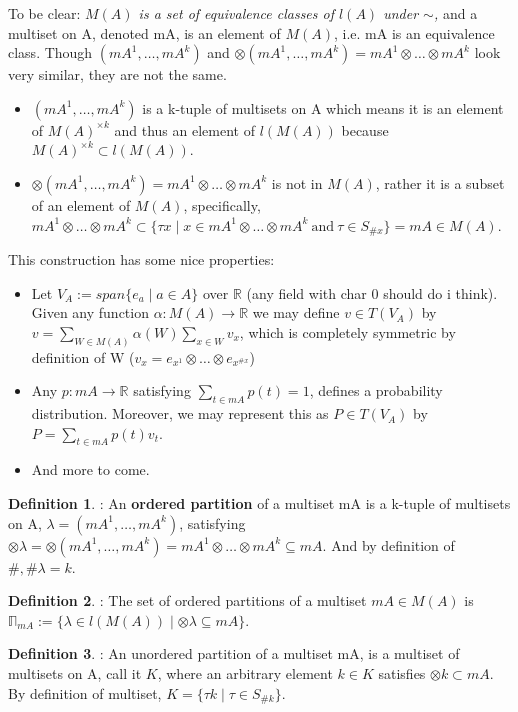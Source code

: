 \documentclass{article}
\theoremstyle{definition}
\newtheorem{definition}{Definition}
\begin{document}
To be clear: \textit{$M(A)$ is a set of equivalence classes of $l(A)$ under $\sim$,} and a multiset on A, denoted mA, is an element of $M(A)$, i.e. mA is an equivalence class. Though $(mA^1,\dots,mA^k)$ and $\otimes(mA^1,\dots,mA^k)=mA^1\otimes\dots\otimes mA^k$ look very similar, they are not the same.
\begin{itemize}
\item $(mA^1,\dots,mA^k)$ is a k-tuple of multisets on A which means it is an element of $M(A)^{\times k}$ and thus an element of $l(M(A))$ because $M(A)^{\times k} \subset l(M(A))$.
\item $\otimes(mA^1,\dots,mA^k)=mA^1 \otimes\dots\otimes mA^k$ is not in $M(A)$, rather it is a subset of an element of $M(A)$, specifically, $mA^1 \otimes\dots\otimes mA^k \subset \{ \tau x \mid  x\in mA^1\otimes\dots\otimes mA^k \:\text{and}\: \tau \in S_{\#x} \} = mA \in M(A)$.
\end{itemize}
This construction has some nice properties:
\begin{itemize}
\item Let $V_A := span\{e_a \mid a \in A\}$ over $\mathbb{R}$ (any field with char 0 should do i think). Given any function $\alpha:M(A)\rightarrow\mathbb{R}$ we may define $v \in T(V_A)$ by $v = \sum_{W \in M(A)} \alpha(W) \sum_{x\in W}v_x$, which is completely symmetric by definition of W ($v_x = e_{x^1}\otimes\dots\otimes e_{x^{\#x}}$)
\item Any $p:mA\rightarrow\mathbb{R}$ satisfying $\sum_{t\in mA} p(t) = 1$, defines a probability distribution. Moreover, we may represent this as $P \in T(V_A)$ by $P=\sum_{t\in mA} p(t)v_t$.
\item And more to come.
\end{itemize}

\begin{definition}: An \textbf{ordered partition} of a multiset mA is a k-tuple of multisets on A, $\lambda=(mA^1,\dots,mA^k)$, satisfying $\otimes\lambda=\otimes(mA^1,\dots,mA^k)=mA^1\otimes\dots\otimes mA^k \subseteq mA$. And by definition of $\#, \#\lambda=k$. \end{definition}

\begin{definition}: The set of ordered partitions of a multiset $mA\in M(A)$ is $\mathbb{\Pi}_{mA}:=\{\lambda \in l(M(A)) \mid \otimes\lambda \subseteq mA\}$. \end{definition}

\begin{definition}: An unordered partition of a multiset mA, is a multiset of multisets on A, call it $K$, where an arbitrary element $k\in K$ satisfies $\otimes k \subset mA$. By definition of multiset, $K=\{ \tau k \mid \tau \in S_{\#k}\}$.\end{definition}
\end{document}
